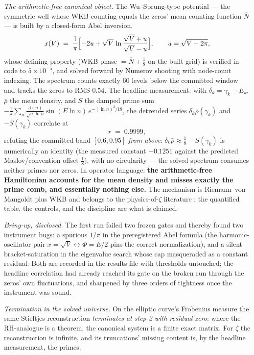 \documentclass[11pt]{article}
\theoremstyle{remark}
\newcommand{\Nbar}{\overline{N}}
\begin{document}
\emph{The arithmetic-free canonical object.} The Wu--Sprung-type potential \cite{WuSprung,SchHutch}
--- the symmetric well whose WKB counting equals the zeros' mean counting function $\Nbar$ --- is
built by a closed-form Abel inversion,
\[
x(V) \;=\; \frac{1}{\pi}\Bigl[-2u + \sqrt V \,\ln\frac{\sqrt V + u}{\sqrt V - u}\Bigr],
\qquad u = \sqrt{V - 2\pi},
\]
whose defining property (WKB phase $= \Nbar + \tfrac18$ on the built grid) is verified in-code to
$5\times10^{-5}$, and solved forward by Numerov shooting with node-count indexing. The spectrum
counts exactly 60 levels below the committed window and tracks the zeros to RMS $0.54$. The headline
measurement: with $\delta_k = \gamma_k - E_k$, $\bar\rho$ the mean density, and $S$ the damped prime
sum $-\frac1\pi\sum_{n} \frac{\Lambda(n)}{\sqrt n \ln n}\sin(E\ln n)\,e^{-(\ln n)^2/18}$, the
detrended series $\delta_k\bar\rho(\gamma_k)$ and $-S(\gamma_k)$ correlate at
\[
r \;=\; 0.9999,
\]
refuting the committed band $[0.6, 0.95]$ \emph{from above}: $\delta_k\bar\rho \approx \tfrac18 -
S(\gamma_k)$ is numerically an identity (the measured constant $+0.1251$ against the predicted
Maslov/convention offset $\tfrac18$), with no circularity --- the solved spectrum consumes neither
primes nor zeros. In operator language: \textbf{the arithmetic-free Hamiltonian accounts for the
mean density and misses exactly the prime comb, and essentially nothing else.} The mechanism is
Riemann--von Mangoldt plus WKB and belongs to the physics-of-$\zeta$ literature
\cite{WuSprung,SchHutch,BerryKeating}; the quantified table, the controls, and the discipline are
what is claimed.

\emph{Bring-up, disclosed.} The first run failed two frozen gates and thereby found two instrument
bugs: a spurious $1/\pi$ in the preregistered Abel formula (the harmonic-oscillator pair
$x = \sqrt V \leftrightarrow \Phi = E/2$ pins the correct normalization), and a silent
bracket-saturation in the eigenvalue search whose cap masqueraded as a constant residual. Both are
recorded in the results file with thresholds untouched; the headline correlation had already reached
its gate on the broken run through the zeros' own fluctuations, and sharpened by three orders of
tightness once the instrument was sound.

\emph{Termination in the solved universe.} On the elliptic curve's Frobenius measure the same
Stieltjes reconstruction \emph{terminates at step 2 with residual zero}: where the RH-analogue is a
theorem, the canonical system is a finite exact matrix. For $\zeta$ the reconstruction is infinite,
and its truncations' missing content is, by the headline measurement, the primes.
\end{document}
